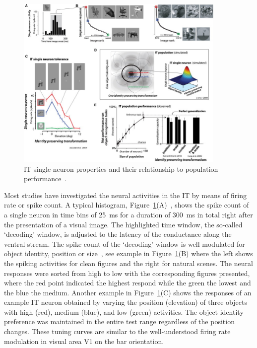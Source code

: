 \begin{figure}[b!]
	\centering
	\includegraphics[width=0.9\textwidth]{pics/IT.jpg}
	\caption{	
		IT single-neuron properties and their relationship to population performance~\cite{dicarlo2012does}.
	}
	\label{Fig:IT}
\end{figure}
Most studies have investigated the neural activities in the IT by means of firing rate or spike count.
A typical histogram, Figure~\ref{Fig:IT}(A)~\cite{zoccolan2007trade}, shows the spike count of a single neuron in time bins of 25~ms for a duration of 300~ms in total right after the presentation of a visual image.
The highlighted time window, the so-called `decoding' window, is adjusted to the latency of the conductance along the ventral stream. 
The spike count of the `decoding' window is well modulated for object identity, position or size~\cite{desimone1984stimulus,kaneko1996sequence}, see example in Figure~\ref{Fig:IT}(B) where the left shows the spiking activities for clean figures and the right for natural scenes.
The neural responses were sorted from high to low with the corresponding figures presented, where the red point indicated the highest respond while the green the lowest and the blue the medium.
Another example in Figure~\ref{Fig:IT}(C) shows the responses of an example IT neuron obtained by varying the position (elevation) of three objects with high (red), medium (blue), and low (green) activities.
The object identity preference was maintained in the entire test range regardless of the position changes.
These tuning curves are similar to the well-understood firing rate modulation in visual area V1 on the bar orientation.


